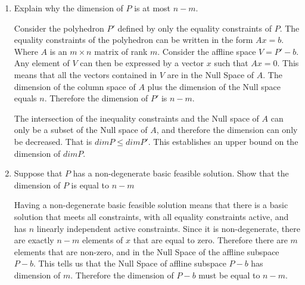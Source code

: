 \documentclass[12pt]{paper}
\begin{document}
\begin{enumerate}
\item Explain why the dimension of $P$ is at most $n-m$.

  Consider the polyhedron $P'$ defined by only the equality
  constraints of $P$. The equality constraints of the polyhedron can
  be written in the form $Ax = b$. Where $A$ is an $m \times n$ matrix of
  rank $m$. Consider the affline space $V = P' - b$. Any element of
  $V$ can then be expressed by a vector $x$ such that $Ax = 0$. This
  means that all the vectors contained in $V$ are in the Null Space of
  $A$. The dimension of the column space of $A$ plus the dimension of
  the Null space equals $n$. Therefore the dimension of $P'$ is $n-m$.

  The intersection of the inequality constraints and the Null space of
  $A$ can only be a subset of the Null space of $A$, and therefore the
  dimension can only be decreased. That is $dim P \leq dim P'$. This
  establishes an upper bound on the dimension of $dim P$.

  
\item Suppose that $P$ has a non-degenerate basic feasible
  solution. Show that the dimension of $P$ is equal to $n-m$

  Having a non-degenerate basic feasible solution means that there is
  a basic solution that meets all constraints, with all equality
  constraints active, and has $n$ linearly independent active
  constraints. Since it is non-degenerate, there are exactly $n-m$
  elements of $x$ that are equal to zero. Therefore there are $m$
  elements that are non-zero, and in the Null Space of the affline
  subspace $P - b$. This tells us that the Null Space of affline
  subspace $P - b$ has dimension of $m$. Therefore the dimension of
  $P-b$ must be equal to $n-m$.



  
\end{enumerate}
\end{document}
